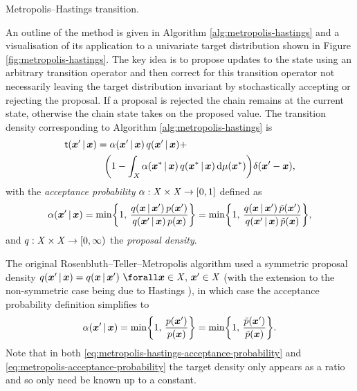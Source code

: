 \begin{algorithm}[!t]
\caption{Metropolis--Hastings transition.}
\label{alg:metropolis-hastings}

\end{algorithm}

An outline of the method is given in Algorithm \ref{alg:metropolis-hastings} and a visualisation of its application to a univariate target distribution shown in Figure \ref{fig:metropolis-hastings}. The key idea is to propose updates to the state using an arbitrary transition operator and then correct for this transition operator not necessarily leaving the target distribution invariant by stochastically accepting or rejecting the proposal. If a proposal is rejected the chain remains at the current state, otherwise the chain state takes on the proposed value. The transition density corresponding to Algorithm \ref{alg:metropolis-hastings} is
\begin{equation}\label{eq:metropolis-hastings-transition-density}
\begin{split}
  \trans(\vct{x}' \gvn \vct{x}) &=
  \alpha(\vct{x}'\gvn \vct{x})\,q(\vct{x}'\gvn \vct{x}) + \, \\
  &\phantom{=}  
  \lpa 1 - 
  \int_{\set{X}} \alpha(\vct{x}^*\gvn \vct{x})\,q(\vct{x}^*\gvn \vct{x}) \,\dr\mu(\vct{x}^*)
  \rpa
  \delta(\vct{x}' - \vct{x}),
\end{split}
\end{equation}
with the \emph{acceptance probability} $\alpha : \mathit{X} \times \mathit{X} \to [0,1]$ defined as
\begin{equation}\label{eq:metropolis-hastings-acceptance-probability}
  \alpha(\vct{x}'\gvn \vct{x}) =
  \min\lbr 1,\, \frac{q(\vct{x}\gvn\vct{x}')\,\tgtdens(\vct{x}')}{q(\vct{x}'\gvn\vct{x})\,\tgtdens(\vct{x})} \rbr =
  \min\lbr 1,\, \frac{q(\vct{x}\gvn\vct{x}')\,\utgtdens(\vct{x}')}{q(\vct{x}'\gvn\vct{x})\,\utgtdens(\vct{x})} \rbr,
\end{equation}
and  $q : \mathit{X} \times \mathit{X} \to [0, \infty)$ the  \emph{proposal density}. %

The original Rosenbluth--Teller--Metropolis algorithm used a symmetric proposal density $q(\vct{x}' \gvn \vct{x}) = q(\vct{x} \gvn \vct{x}') ~\forall \vct{x} \in \set{X},\,\vct{x}'\in\set{X}$ (with the extension to the non-symmetric case being due to Hastings \citep{hastings1970monte}), in which case the acceptance probability definition simplifies to
\begin{equation}\label{eq:metropolis-acceptance-probability}
  \alpha(\vct{x}'\gvn \vct{x}) =
  \min\lbr 1,\, \frac{\tgtdens(\vct{x}')}{\tgtdens(\vct{x})} \rbr =
  \min\lbr 1,\, \frac{\utgtdens(\vct{x}')}{\utgtdens(\vct{x})} \rbr.
\end{equation}
Note that in both \eqref{eq:metropolis-hastings-acceptance-probability} and \eqref{eq:metropolis-acceptance-probability} the target density only appears as a ratio and so only need be known up to a constant.

